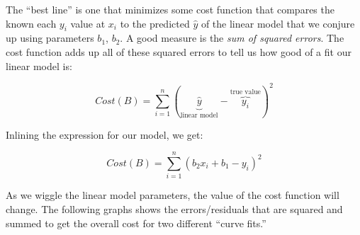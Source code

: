 \documentclass[titlepage]{tufte-book}
\begin{document}
\begin{fullwidth}
The ``best line'' is one that minimizes some cost function that compares the known each $y_i$ value at $x_i$ to the predicted $\hat{y}$ of the linear model that we conjure up using parameters $b_1$, $b_2$. A good measure is the {\em sum of squared errors}. The cost function adds up all of these squared errors to tell us how good of a fit our linear model is:

\[
Cost(B) = \sum_{i=1}^{n}(\underbrace{\hat{y}}_\text{linear model} - \overbrace{y_i}^\text{true value})^2
\]

\noindent Inlining the expression for our model, we get:

\[
Cost(B) = \sum_{i=1}^{n}(b_2 x_i + b_1 - y_i)^2
\]

\noindent As we wiggle the linear model parameters, the value of the cost function will change.  The following graphs shows the errors/residuals that are squared and summed to get the overall cost for two different ``curve fits.''

\begin{center}
\\
\end{center}


\end{fullwidth}
\end{document}
